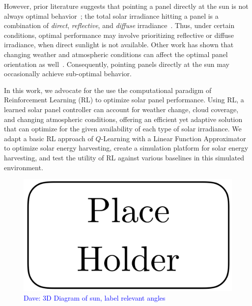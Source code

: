 \documentclass[11pt]{article}
\newcommand{\dnote}[1]{\textcolor{blue}{Dave: #1}}
\begin{document}
However, prior literature suggests that pointing a panel directly at the sun is not always optimal behavior~\citet{King2001}; the total solar irradiance hitting a panel is a combination of {\it direct}, {\it reflective}, and {\it diffuse} irradiance~\cite{Benghanem2011}. Thus, under certain conditions, optimal performance may involve prioritizing reflective or diffuse irradiance, when direct sunlight is not available. Other work has shown that changing weather and atmospheric conditions can affect the optimal panel orientation as well~\cite{Kelly2009}. Consequently, pointing panels directly at the sun may  occasionally achieve sub-optimal behavior.

In this work, we advocate for the use the computational paradigm of Reinforcement Learning (RL) to optimize solar panel performance. Using RL, a learned solar panel controller can account for weather change, cloud coverage, and changing atmospheric conditions, offering an efficient yet adaptive solution that can optimize for the given availability of each type of solar irradiance. We adapt a basic RL approach of $Q$-Learning with a Linear Function Approximator to optimize solar energy harvesting, create a simulation platform for solar energy harvesting, and test the utility of RL against various baselines in this simulated environment.



\begin{figure}[t]
\begin{center}
\includegraphics[scale=0.3]{figures/placeholder.png}
\caption{\dnote{3D Diagram of sun, label relevant angles}}
\end{center}
\end{figure}
\end{document}
